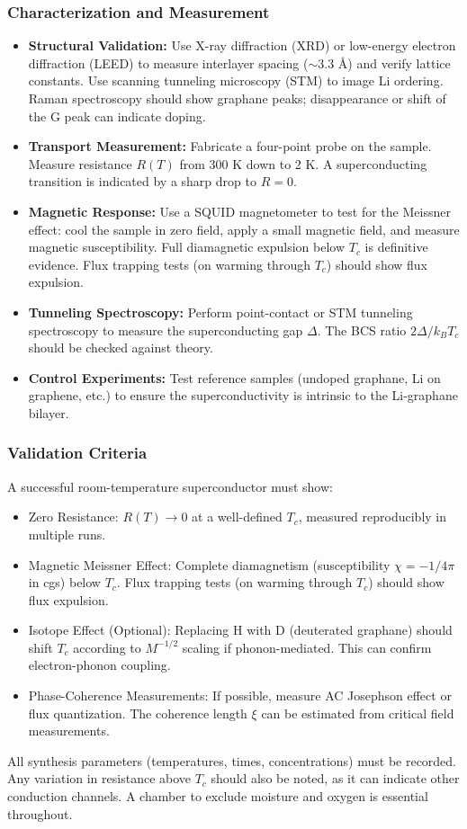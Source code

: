 \documentclass[11pt,a4paper]{article}
\begin{document}
\subsubsection{Characterization and Measurement}
\label{ssubsec:characterization_measurement_detailed}
\begin{itemize}
\item \textbf{Structural Validation:} Use X-ray diffraction (XRD) or low-energy electron diffraction (LEED) to measure interlayer spacing ($\sim 3.3$ Å) and verify lattice constants. Use scanning tunneling microscopy (STM) to image Li ordering. Raman spectroscopy should show graphane peaks; disappearance or shift of the G peak can indicate doping.
\item \textbf{Transport Measurement:} Fabricate a four-point probe on the sample. Measure resistance $R(T)$ from 300 K down to 2 K. A superconducting transition is indicated by a sharp drop to $R=0$.
\item \textbf{Magnetic Response:} Use a SQUID magnetometer to test for the Meissner effect: cool the sample in zero field, apply a small magnetic field, and measure magnetic susceptibility. Full diamagnetic expulsion below $T_c$ is definitive evidence. Flux trapping tests (on warming through $T_c$) should show flux expulsion.
\item \textbf{Tunneling Spectroscopy:} Perform point-contact or STM tunneling spectroscopy to measure the superconducting gap $\Delta$. The BCS ratio $2\Delta/k_B T_c$ should be checked against theory.
\item \textbf{Control Experiments:} Test reference samples (undoped graphane, Li on graphene, etc.) to ensure the superconductivity is intrinsic to the Li-graphane bilayer.
\end{itemize}

\subsubsection{Validation Criteria}
\label{ssubsec:validation_criteria_detailed}
A successful room-temperature superconductor must show:
\begin{itemize}
\item Zero Resistance: $R(T) \to 0$ at a well-defined $T_c$, measured reproducibly in multiple runs.
\item Magnetic Meissner Effect: Complete diamagnetism (susceptibility $\chi = -1/4\pi$ in cgs) below $T_c$. Flux trapping tests (on warming through $T_c$) should show flux expulsion.
\item Isotope Effect (Optional): Replacing H with D (deuterated graphane) should shift $T_c$ according to $M^{-1/2}$ scaling if phonon-mediated. This can confirm electron-phonon coupling.
\item Phase-Coherence Measurements: If possible, measure AC Josephson effect or flux quantization. The coherence length $\xi$ can be estimated from critical field measurements.
\end{itemize}
All synthesis parameters (temperatures, times, concentrations) must be recorded. Any variation in resistance above $T_c$ should also be noted, as it can indicate other conduction channels. A chamber to exclude moisture and oxygen is essential throughout.
\end{document}
